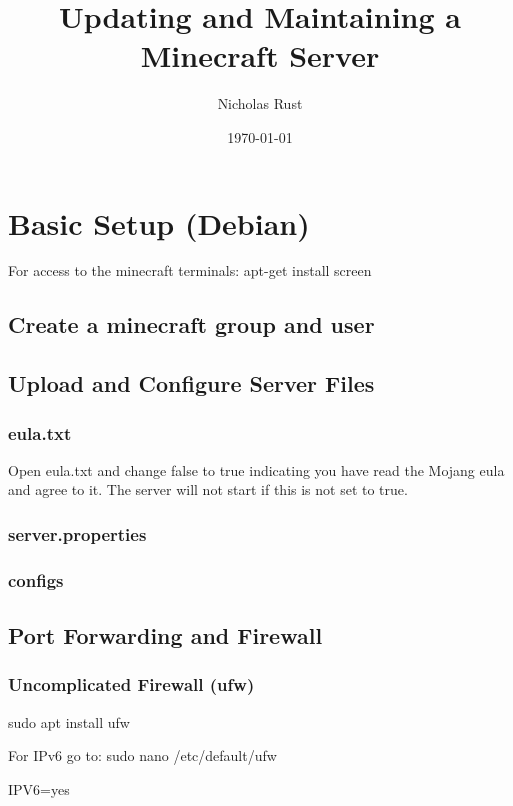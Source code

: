 \documentclass{article}
\title{Updating and Maintaining a Minecraft Server}
\author{Nicholas Rust}
\date{\today}
\begin{document}
\maketitle

\tableofcontents

\pagebreak

\section{Basic Setup (Debian)}
For access to the minecraft terminals:
apt-get install screen 

\subsection{Create a minecraft group and user}

\subsection{Upload and Configure Server Files}

\subsubsection{eula.txt}
Open eula.txt and change false to true indicating you have read the Mojang eula and agree to it. The server will not start if this is not set to true.

\subsubsection{server.properties}

\subsubsection{configs}

\subsection{Port Forwarding and Firewall}

\subsubsection{Uncomplicated Firewall (ufw)}

sudo apt install ufw

For IPv6 go to:
sudo nano /etc/default/ufw

IPV6=yes\\
\end{document}
